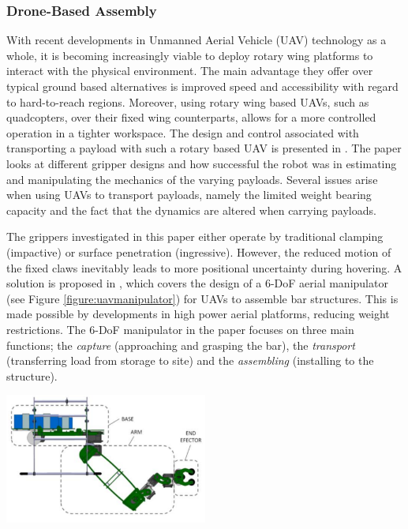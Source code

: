 \documentclass[11pt]{article}
\begin{document}
\subsubsection{Drone-Based Assembly}
With recent developments in Unmanned Aerial Vehicle (UAV) technology as a whole, it is becoming increasingly viable to deploy rotary wing platforms to interact with the physical environment. The main advantage they offer over typical ground based alternatives is improved speed and accessibility with regard to hard-to-reach regions. Moreover, using rotary wing based UAVs, such as quadcopters, over their fixed wing counterparts, allows for a more controlled operation in a tighter workspace. The design and control associated with transporting a payload with such a rotary based UAV is presented in \cite{mellinger2011}. The paper looks at different gripper designs and how successful the robot was in estimating and manipulating the mechanics of the varying payloads. Several issues arise when using UAVs to transport payloads, namely the limited weight bearing capacity and the fact that the dynamics are altered when carrying payloads. 

The grippers investigated in this paper either operate by traditional clamping (impactive) or surface penetration (ingressive). However, the reduced motion of the fixed claws inevitably leads to more positional uncertainty during hovering. A solution is proposed in \cite{cano2013}, which covers the design of a 6-DoF aerial manipulator (see Figure \ref{figure:uavmanipulator}) for UAVs to assemble bar structures. This is made possible by developments in high power aerial platforms, reducing weight restrictions. The 6-DoF manipulator in the paper focuses on three main functions; the \textit{capture} (approaching and grasping the bar), the \textit{transport} (transferring load from storage to site) and the \textit{assembling} (installing to the structure).


\begin{center}
\includegraphics[width = 0.5\textwidth]{uavmanipulator.png}
\label{figure:uavmanipulator}
\end{center}
\end{document}

